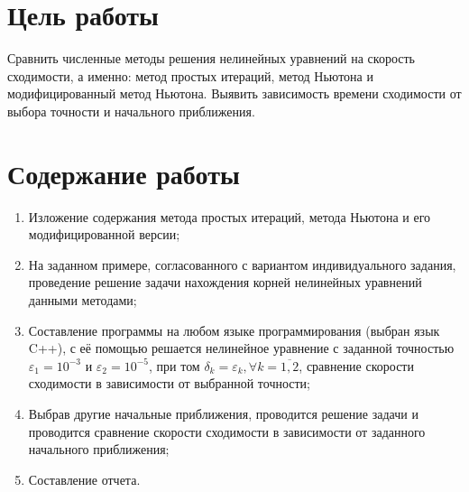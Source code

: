 \section{Цель работы}

Сравнить численные методы решения нелинейных уравнений на скорость сходимости, а именно: метод простых итераций, метод Ньютона и модифицированный метод Ньютона. Выявить зависимость времени сходимости от выбора точности и начального приближения.

\section{Содержание работы}
\begin{enumerate}
  \item Изложение содержания метода простых итераций, метода Ньютона и его модифицированной версии;
  \item На заданном примере, согласованного с вариантом индивидуального задания, проведение решение задачи нахождения корней нелинейных уравнений данными методами;
  \item Составление программы на любом языке программирования (выбран язык C++), с её помощью решается нелинейное уравнение с заданной точностью \( \varepsilon_1 = 10^{-3} \) и \(\varepsilon_2 = 10^{-5}\), при том \(\delta_k = \varepsilon_k, \forall k = \overline{1, 2}\), сравнение скорости сходимости в зависимости от выбранной точности;
  \item Выбрав другие начальные приближения, проводится решение задачи и проводится сравнение скорости сходимости в зависимости от заданного начального приближения;
  \item Составление отчета.
\end{enumerate}

